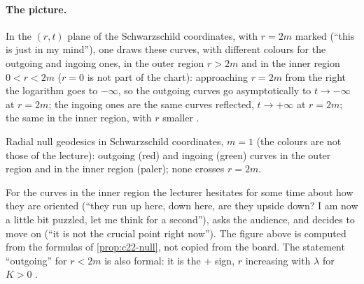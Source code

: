 \begin{paracol}{2}
\paragraph{The picture.} In the $(r,t)$ plane of the Schwarzschild coordinates, with $r=2m$ marked (``this is just in my mind''), one draws these curves, with different colours for the outgoing and ingoing ones, in the outer region $r>2m$ and in the inner region $0<r<2m$ ($r=0$ is not part of the chart): approaching $r=2m$ from the right the logarithm goes to $-\infty$, so the outgoing curves go asymptotically to $t\to-\infty$ at $r=2m$; the ingoing ones are the same curves reflected, $t\to+\infty$ at $r=2m$; the same in the inner region, with $r$ smaller .

\begin{nfigure}
\caption{Radial null geodesics in Schwarzschild coordinates, $m=1$ (the colours are not those of the lecture): outgoing (red) and ingoing (green) curves in the outer region and in the inner region (paler); none crosses $r=2m$.}\label{fig:c22-schw-null}
\end{nfigure}

\begin{coursenote}
For the curves in the inner region the lecturer hesitates for some time about how they are oriented (``they run up here, down here, are they upside down? I am now a little bit puzzled, let me think for a second''), asks the audience, and decides to move on (``it is not the crucial point right now''). The figure above is computed from the formulas of \cref{prop:c22-null}, not copied from the board. The statement ``outgoing'' for $r<2m$ is also formal: it is the $+$ sign, $r$ increasing with $\lambda$ for $K>0$ .
\end{coursenote}


\end{paracol}

